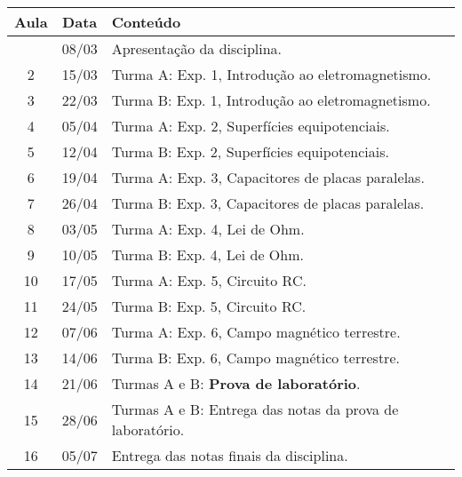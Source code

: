 \begin{center}
\begin{longtable}{ccp{70mm}}
\toprule
Aula & Data & Conteúdo \\
\midrule
\endhead
\bottomrule
\endfoot
1 & 08/03 & Apresentação da disciplina. \\
2 & 15/03 & Turma A: Exp. 1, Introdução ao eletromagnetismo. \\
3 & 22/03 & Turma B: Exp. 1, Introdução ao eletromagnetismo. \\
4 & 05/04 & Turma A: Exp. 2, Superfícies equipotenciais. \\
5 & 12/04 & Turma B: Exp. 2, Superfícies equipotenciais. \\
6 & 19/04 & Turma A: Exp. 3, Capacitores de placas paralelas. \\
7 & 26/04 & Turma B: Exp. 3, Capacitores de placas paralelas. \\
8 & 03/05 & Turma A: Exp. 4, Lei de Ohm. \\
9 & 10/05 & Turma B: Exp. 4, Lei de Ohm. \\
10 & 17/05 & Turma A: Exp. 5, Circuito RC. \\
11 & 24/05 & Turma B: Exp. 5, Circuito RC. \\
12 & 07/06 & Turma A: Exp. 6, Campo magnético terrestre. \\
13 & 14/06 & Turma B: Exp. 6, Campo magnético terrestre. \\
14 & 21/06 & Turmas A e B: \textbf{Prova de laboratório}. \\
15 & 28/06 & Turmas A e B: Entrega das notas da prova de laboratório. \\ 
16 & 05/07 & Entrega das notas finais da disciplina. \\
\end{longtable}
\end{center}

\cleardoublepage

